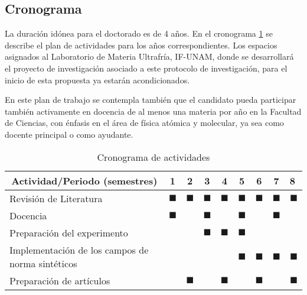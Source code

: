\documentclass[superscriptaddress,onecolumn,aps,preprint,showpacs,nofootinbib,pra,11pt]{revtex4-2}
\begin{document}
\begin{normalsize}
\section{Cronograma}

La duración idónea para el doctorado es de 4 años. En el cronograma \ref{table:cronograma} se describe el plan de actividades para los años correspondientes. Los espacios asignados al Laboratorio de Materia Ultrafría, IF-UNAM, donde se desarrollará el proyecto de investigación asociado a este protocolo de investigación, para el inicio de esta propuesta ya estarán acondicionados.\medskip

En este plan de trabajo se contempla también que el candidato pueda participar también activamente en docencia de al menos una materia por año en la Facultad de Ciencias, con énfasis en el área de física atómica y molecular, ya sea como docente principal o como ayudante.

\begin{table}[H]
\caption{Cronograma de actividades}\label{table:cronograma}

\centering{}
\begin{tabular}{|c|c|c|c|c|c|c|c|l|}
\hline
\hline
\textbf{Actividad/Periodo (semestres)}			& 1 & 2 & 3 & 4 & 5 & 6 & 7 & 8 \\ \hline \hline


\multicolumn{1}{|l|}{Revisión de Literatura}	& $\blacksquare$ & $\blacksquare$ & $\blacksquare$ & $\blacksquare$ & $\blacksquare$ & $\blacksquare$ & $\blacksquare$ & $\blacksquare$ \\ \hline

\multicolumn{1}{|l|}{Docencia}	& $\blacksquare$  &  & $\blacksquare$  &  & $\blacksquare$  &  & $\blacksquare$  &   \\ \hline

\multicolumn{1}{|l|}{Preparación del experimento}	&  &  & $\blacksquare$  & $\blacksquare$ & $\blacksquare$  &  &   &   \\ \hline

\multicolumn{1}{|l|}{Implementación de los campos de norma sintéticos}	&  &  &  &  & $\blacksquare$  & $\blacksquare$ & $\blacksquare$  &  $\blacksquare$ \\ \hline

\multicolumn{1}{|l|}{Preparación de artículos}	&   & $\blacksquare$ &   & $\blacksquare$ &   & $\blacksquare$ &   & 	$\blacksquare$ \\ \hline


\end{tabular}
\end{table}
\end{normalsize}
\end{document}
